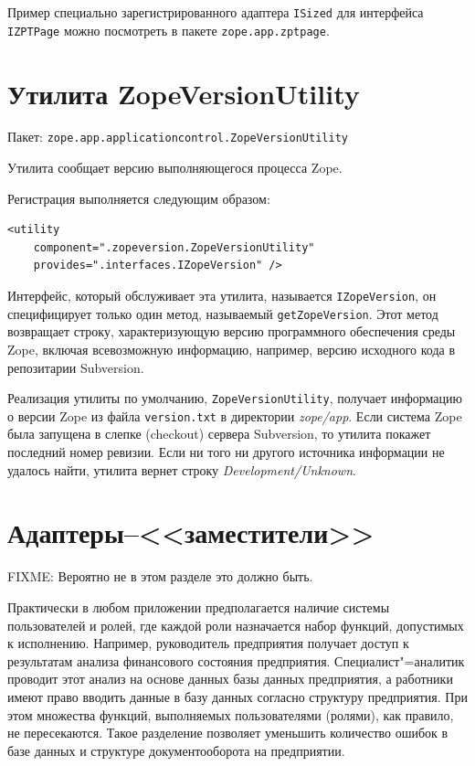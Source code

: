 \documentclass[a4paper,openany,twoside,final]{book}
\providecommand*{\DUroletitlereference}[1]{\textsl{#1}}
\begin{document}
Пример специально зарегистрированного адаптера \texttt{ISized} для интерфейса \texttt{IZPTPage} можно посмотреть в пакете \texttt{zope.app.zptpage}.


\section{Утилита ZopeVersionUtility%
  \label{zopeversionutility}%
}

Пакет: \texttt{zope.app.applicationcontrol.ZopeVersionUtility}

Утилита сообщает версию выполняющегося процесса Zope.

Регистрация выполняется следующим образом:

\begin{verbatim}
<utility
    component=".zopeversion.ZopeVersionUtility"
    provides=".interfaces.IZopeVersion" />
\end{verbatim}

Интерфейс, который обслуживает эта утилита, называется \texttt{IZopeVersion}, он специфицирует только один метод, называемый \texttt{getZopeVersion}.  Этот метод возвращает строку, характеризующую версию программного обеспечения среды Zope, включая всевозможную информацию, например, версию исходного кода в репозитарии Subversion.

Реализация утилиты по умолчанию, \texttt{ZopeVersionUtility}, получает информацию о версии Zope из файла \texttt{version.txt} в директории \DUroletitlereference{zope/app}.  Если система Zope была запущена в слепке (checkout) сервера Subversion, то утилита покажет последний номер ревизии.  Если ни того ни другого источника информации не удалось найти, утилита вернет строку \DUroletitlereference{Development/Unknown}.

\section{Адаптеры--<<заместители>>}
\label{sec:proxyadapters}

FIXME: Вероятно не в этом разделе это должно быть.

Практически в любом приложении предполагается наличие системы пользователей и ролей, где каждой роли назначается набор функций, допустимых к исполнению.  Например, руководитель предприятия получает доступ к результатам анализа финансового состояния предприятия.  Специалист"=аналитик проводит этот анализ на основе данных базы данных предприятия, а работники имеют право вводить данные в базу данных согласно структуру предприятия.  При этом множества функций, выполняемых пользователями (ролями), как правило, не пересекаются.  Такое разделение позволяет уменьшить количество ошибок в базе данных и структуре документооборота на предприятии.
\end{document}
